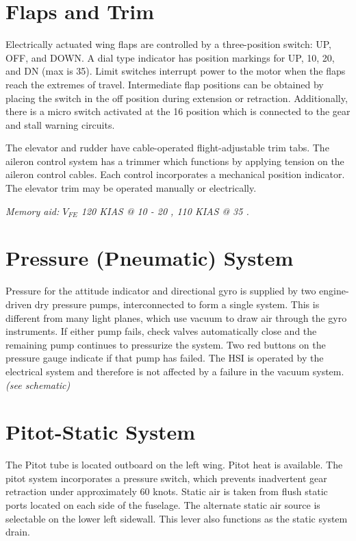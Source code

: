 {\section{Flaps and Trim}

Electrically actuated wing flaps are controlled by a three-position switch: UP, OFF, and DOWN. A dial type
indicator has position markings for UP, 10, 20, and DN (max is 35\degree{}). Limit switches interrupt power to the motor
when the flaps reach the extremes of travel. Intermediate flap positions can be obtained by placing the switch in the
off position during extension or retraction. Additionally, there is a micro switch activated at the 16\degree{} position which
is connected to the gear and stall warning circuits.

The elevator and rudder have cable-operated flight-adjustable trim tabs. The aileron control system has a trimmer
which functions by applying tension on the aileron control cables. Each control incorporates a mechanical position
indicator. The elevator trim may be operated manually or electrically.

\emph{Memory aid: $V_{FE}$ 120 KIAS @ 10 \degree{} - 20 \degree{}, 110 KIAS @ 35 \degree.}

\section{Pressure (Pneumatic) System}

Pressure for the attitude indicator and directional gyro is supplied by two engine-driven dry pressure pumps,
interconnected to form a single system. This is different from many light planes, which use vacuum to draw air
through the gyro instruments. If either pump fails, check valves automatically close and the remaining pump
continues to pressurize the system. Two red buttons on the pressure gauge indicate if that pump has failed. The HSI
is operated by the electrical system and therefore is not affected by a failure in the vacuum system.
\emph{(see schematic)}

\section{Pitot-Static System}

The Pitot tube is located outboard on the left wing. Pitot heat is available. The pitot system incorporates a pressure
switch, which prevents inadvertent gear retraction under approximately 60 knots. Static air is taken from flush static
ports located on each side of the fuselage. The alternate static air source is selectable on the lower left sidewall.
This lever also functions as the static system drain.

}

